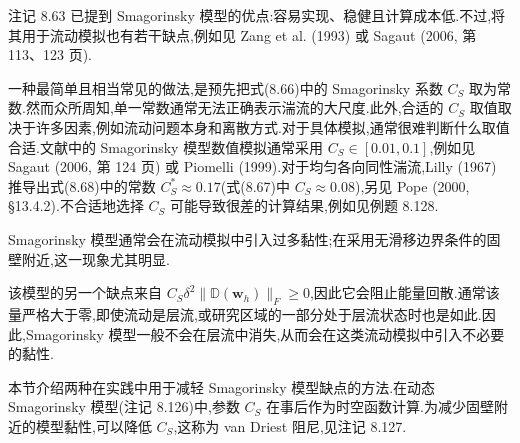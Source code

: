 \begin{note}
\label{note:smagorinsky-model-drawbacks}
注记 8.63 已提到 Smagorinsky 模型的优点:容易实现、稳健且计算成本低.不过,将其用于流动模拟也有若干缺点,例如见 Zang et al. (1993) 或 Sagaut (2006, 第 113、123 页).

一种最简单且相当常见的做法,是预先把式(8.66)中的 Smagorinsky 系数 $C_S$ 取为常数.然而众所周知,单一常数通常无法正确表示湍流的大尺度.此外,合适的 $C_S$ 取值取决于许多因素,例如流动问题本身和离散方式.对于具体模拟,通常很难判断什么取值合适.文献中的 Smagorinsky 模型数值模拟通常采用 $C_S\in[0.01,0.1]$,例如见 Sagaut (2006, 第 124 页) 或 Piomelli (1999).对于均匀各向同性湍流,Lilly (1967) 推导出式(8.68)中的常数 $C_S^*\approx0.17$(式(8.67)中 $C_S\approx0.08$),另见 Pope (2000, §13.4.2).不合适地选择 $C_S$ 可能导致很差的计算结果,例如见例题 8.128.

Smagorinsky 模型通常会在流动模拟中引入过多黏性;在采用无滑移边界条件的固壁附近,这一现象尤其明显.

该模型的另一个缺点来自
$C_S\delta^2\|\mathbb{D}(\bm{w}_h)\|_F\ge0$,因此它会阻止能量回散.通常该量严格大于零,即使流动是层流,或研究区域的一部分处于层流状态时也是如此.因此,Smagorinsky 模型一般不会在层流中消失,从而会在这类流动模拟中引入不必要的黏性.
\end{note}

\begin{note}[本节内容]
\label{note:smagorinsky-variants-overview}
本节介绍两种在实践中用于减轻 Smagorinsky 模型缺点的方法.在动态 Smagorinsky 模型(注记 8.126)中,参数 $C_S$ 在事后作为时空函数计算.为减少固壁附近的模型黏性,可以降低 $C_S$,这称为 van Driest 阻尼,见注记 8.127.
\end{note}

